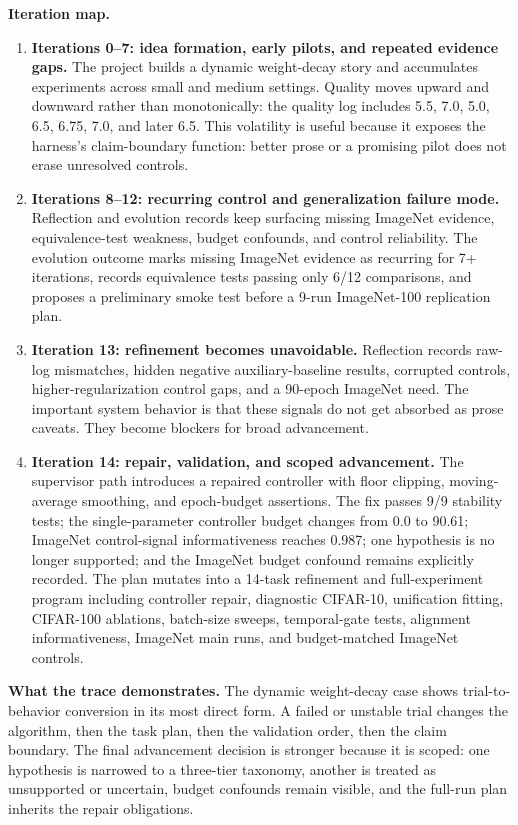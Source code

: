 \documentclass{article}
\begin{document}
\textbf{Iteration map.}
\begin{enumerate}[leftmargin=*, itemsep=2pt]
  \item \textbf{Iterations 0--7: idea formation, early pilots, and repeated evidence gaps.} The project builds a dynamic weight-decay story and accumulates experiments across small and medium settings. Quality moves upward and downward rather than monotonically: the quality log includes 5.5, 7.0, 5.0, 6.5, 6.75, 7.0, and later 6.5. This volatility is useful because it exposes the harness's claim-boundary function: better prose or a promising pilot does not erase unresolved controls.
  \item \textbf{Iterations 8--12: recurring control and generalization failure mode.} Reflection and evolution records keep surfacing missing ImageNet evidence, equivalence-test weakness, budget confounds, and control reliability. The evolution outcome marks missing ImageNet evidence as recurring for 7+ iterations, records equivalence tests passing only 6/12 comparisons, and proposes a preliminary smoke test before a 9-run ImageNet-100 replication plan.
  \item \textbf{Iteration 13: refinement becomes unavoidable.} Reflection records raw-log mismatches, hidden negative auxiliary-baseline results, corrupted controls, higher-regularization control gaps, and a 90-epoch ImageNet need. The important system behavior is that these signals do not get absorbed as prose caveats. They become blockers for broad advancement.
  \item \textbf{Iteration 14: repair, validation, and scoped advancement.} The supervisor path introduces a repaired controller with floor clipping, moving-average smoothing, and epoch-budget assertions. The fix passes 9/9 stability tests; the single-parameter controller budget changes from 0.0 to 90.61; ImageNet control-signal informativeness reaches 0.987; one hypothesis is no longer supported; and the ImageNet budget confound remains explicitly recorded. The plan mutates into a 14-task refinement and full-experiment program including controller repair, diagnostic CIFAR-10, unification fitting, CIFAR-100 ablations, batch-size sweeps, temporal-gate tests, alignment informativeness, ImageNet main runs, and budget-matched ImageNet controls.
\end{enumerate}

\textbf{What the trace demonstrates.} The dynamic weight-decay case shows trial-to-behavior conversion in its most direct form. A failed or unstable trial changes the algorithm, then the task plan, then the validation order, then the claim boundary. The final advancement decision is stronger because it is scoped: one hypothesis is narrowed to a three-tier taxonomy, another is treated as unsupported or uncertain, budget confounds remain visible, and the full-run plan inherits the repair obligations.
\end{document}
